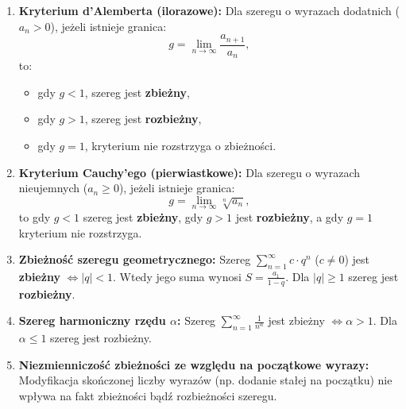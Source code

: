 \begin{teoriabox}
\begin{enumerate}
    \item \textbf{Kryterium d'Alemberta (ilorazowe):}
    Dla szeregu o wyrazach dodatnich ($a_n > 0$), jeżeli istnieje granica:
    \begin{equation}
        g = \lim_{n \to \infty} \frac{a_{n+1}}{a_n},
        \label{eq:dalembert_crit}
    \end{equation}
    to:
    \begin{itemize}
        \item gdy $g < 1$, szereg jest \textbf{zbieżny},
        \item gdy $g > 1$, szereg jest \textbf{rozbieżny},
        \item gdy $g = 1$, kryterium nie rozstrzyga o zbieżności.
    \end{itemize}

    \item \textbf{Kryterium Cauchy'ego (pierwiastkowe):}
    Dla szeregu o wyrazach nieujemnych ($a_n \geqslant 0$), jeżeli istnieje granica:
    \begin{equation}
        g = \lim_{n \to \infty} \sqrt[n]{a_n},
        \label{eq:cauchy_crit}
    \end{equation}
    to gdy $g < 1$ szereg jest \textbf{zbieżny}, gdy $g > 1$ jest \textbf{rozbieżny}, a gdy $g = 1$ kryterium nie rozstrzyga.

    \item \textbf{Zbieżność szeregu geometrycznego:}
    Szereg $\sum_{n=1}^{\infty} c \cdot q^n$ ($c \neq 0$) jest \textbf{zbieżny} $\iff |q| < 1$. Wtedy jego suma wynosi $S = \frac{a_1}{1 - q}$. Dla $|q| \geqslant 1$ szereg jest \textbf{rozbieżny}.

    \item \textbf{Szereg harmoniczny rzędu $\alpha$:}
    Szereg $\sum_{n=1}^{\infty} \frac{1}{n^\alpha}$ jest zbieżny $\iff \alpha > 1$. Dla $\alpha \leqslant 1$ szereg jest rozbieżny.

    \item \textbf{Niezmienniczość zbieżności ze względu na początkowe wyrazy:}
    Modyfikacja skończonej liczby wyrazów (np. dodanie stałej na początku) nie wpływa na fakt zbieżności bądź rozbieżności szeregu.
\end{enumerate}
\end{teoriabox}

\vspace{0.2cm}

